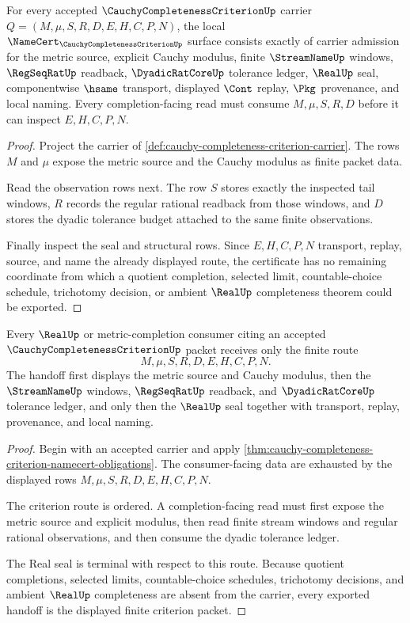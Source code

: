 \begin{theorem}
\label{thm:cauchy-completeness-criterion-namecert-obligations}
For every accepted $\CauchyCompletenessCriterionUp$ carrier $Q=(M,\mu,S,R,D,E,H,C,P,N)$, the local $\NameCert_{\CauchyCompletenessCriterionUp}$ surface consists exactly of carrier admission for the metric source, explicit Cauchy modulus, finite $\StreamNameUp$ windows, $\RegSeqRatUp$ readback, $\DyadicRatCoreUp$ tolerance ledger, $\RealUp$ seal, componentwise $\hsame$ transport, displayed $\Cont$ replay, $\Pkg$ provenance, and local naming. Every completion-facing read must consume $M,\mu,S,R,D$ before it can inspect $E,H,C,P,N$.
\end{theorem}
\begin{proof}
Project the carrier of \autoref{def:cauchy-completeness-criterion-carrier}. The rows $M$ and $\mu$ expose the metric source and the Cauchy modulus as finite packet data.

Read the observation rows next. The row $S$ stores exactly the inspected tail windows, $R$ records the regular rational readback from those windows, and $D$ stores the dyadic tolerance budget attached to the same finite observations.

Finally inspect the seal and structural rows. Since $E,H,C,P,N$ transport, replay, source, and name the already displayed route, the certificate has no remaining coordinate from which a quotient completion, selected limit, countable-choice schedule, trichotomy decision, or ambient $\RealUp$ completeness theorem could be exported.
\end{proof}

\begin{theorem}
\label{thm:cauchy-completeness-criterion-real-completion-handoff}
Every $\RealUp$ or metric-completion consumer citing an accepted $\CauchyCompletenessCriterionUp$ packet receives only the finite route
$$
M,\mu,S,R,D,E,H,C,P,N .
$$
The handoff first displays the metric source and Cauchy modulus, then the $\StreamNameUp$ windows, $\RegSeqRatUp$ readback, and $\DyadicRatCoreUp$ tolerance ledger, and only then the $\RealUp$ seal together with transport, replay, provenance, and local naming.
\end{theorem}
\begin{proof}
Begin with an accepted carrier and apply \autoref{thm:cauchy-completeness-criterion-namecert-obligations}. The consumer-facing data are exhausted by the displayed rows $M,\mu,S,R,D,E,H,C,P,N$.

The criterion route is ordered. A completion-facing read must first expose the metric source and explicit modulus, then read finite stream windows and regular rational observations, and then consume the dyadic tolerance ledger.

The Real seal is terminal with respect to this route. Because quotient completions, selected limits, countable-choice schedules, trichotomy decisions, and ambient $\RealUp$ completeness are absent from the carrier, every exported handoff is the displayed finite criterion packet.
\end{proof}

